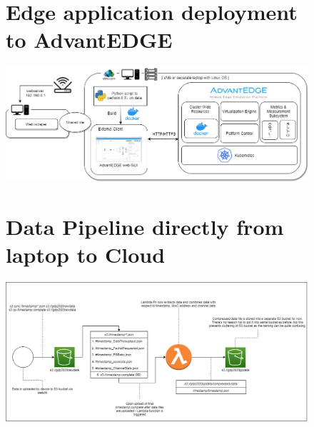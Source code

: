     
\begin{landscape}
\begin{figure}[ht]
\begin{minipage}{\linewidth}
\section{Edge application deployment to AdvantEDGE}
    \centering
    \includegraphics[width=1\linewidth]{pages/Chapter3/Chapter 3 images/System Diagram.png}
    \label{appendix:AdvantEDGE_edge_design}
\end{minipage}
\end{figure}
\end{landscape}

\begin{landscape}
\begin{figure}[ht]
\begin{minipage}{\linewidth}
\section{Data Pipeline directly from laptop to Cloud}

   \centering
    \includegraphics[width=0.99\linewidth]{pages/Chapter3/Chapter 3 images/S3_to_Lambda_to_S3.png}
    
    \label{appendix:data_flow_from_laptop_to_cloud}

\end{minipage}
\end{figure}
    \end{landscape}
    
